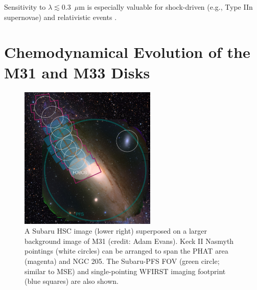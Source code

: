 \documentclass[11pt,a4paper,twoside,onecolumn,openany,final,oldfontcommands]{memoir}
\begin{document}
\begin{sciencerequirement}
\reqitem Sensitivity to $\lambda \lesssim 0.3$~$\mu$m  is  especially valuable for shock-driven (e.g., Type IIn supernovae) and relativistic events \citep[e.g., the atypically bright Type Ib supernova AT 2018cow;][]{margutti2019}.
\end{sciencerequirement}




\section{Chemodynamical Evolution of the M31 and M33 Disks}
\label{sec:m31disk}

\begin{figure}
\begin{center}
\includegraphics[width=0.58\textwidth]{figs/M31_footprint_v3.jpg}
\end{center}
\caption[M31 pointing distribution]{A Subaru HSC image (lower right) superposed on a larger background image of M31 (credit: Adam Evans).  Keck II Nasmyth pointings (white circles) can be arranged to span the PHAT area (magenta) and NGC 205.  The Subaru-PFS FOV (green circle; similar to MSE) and single-pointing WFIRST imaging footprint (blue squares) are also shown.}
\label{fig:M31}    
\end{figure}
\end{document}
